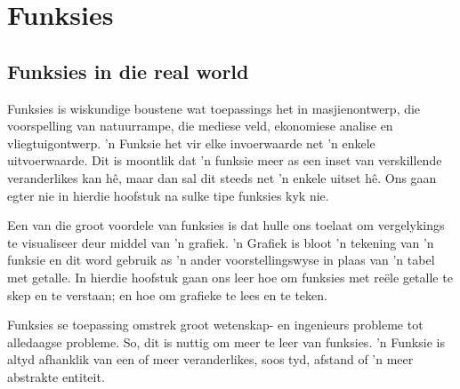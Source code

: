 \chapter{Funksies}
\setcounter{figure}{0}
\setcounter{subfigure}{0}

\section{Funksies in die real world}
Funksies is wiskundige boustene wat toepassings het in masjienontwerp, die voorspelling van natuurrampe, die mediese veld,
ekonomiese analise en vliegtuigontwerp. ’n Funksie het vir elke invoerwaarde net ’n enkele uitvoerwaarde. Dit is moontlik dat
’n funksie meer as een inset van verskillende veranderlikes kan hê, maar dan sal dit steeds net ’n enkele uitset hê. Ons gaan
egter nie in hierdie hoofstuk na sulke tipe funksies kyk nie.\par 
Een van die groot voordele van funksies is dat hulle ons toelaat om vergelykings te visualiseer deur middel van ’n grafiek. ’n
Grafiek is bloot ’n tekening van ’n funksie en dit word gebruik as ’n ander voorstellingswyse in plaas van ’n tabel met getalle.
In hierdie hoofstuk gaan ons leer hoe om funksies met reële getalle te skep en te verstaan; en hoe om grafieke te lees en te
teken.\par 
Funksies se toepassing omstrek groot wetenskap- en ingenieurs probleme tot alledaagse probleme. So, dit is nuttig om meer
te leer van funksies. ’n Funksie is altyd afhanklik van een of meer veranderlikes, soos tyd, afstand of ’n meer abstrakte entiteit.\par 

